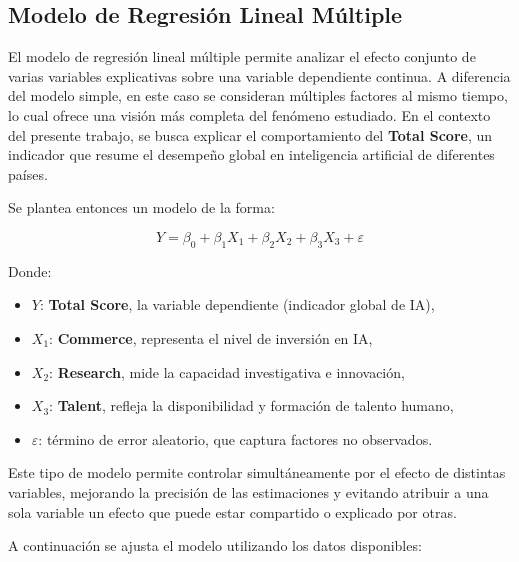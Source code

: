 \documentclass[
]{article}
\begin{document}
\begin{multicols}{2}
\subsection{Modelo de Regresión Lineal Múltiple}

El modelo de regresión lineal múltiple permite analizar el efecto conjunto de varias variables explicativas sobre una variable dependiente continua. A diferencia del modelo simple, en este caso se consideran múltiples factores al mismo tiempo, lo cual ofrece una visión más completa del fenómeno estudiado. En el contexto del presente trabajo, se busca explicar el comportamiento del \textbf{Total Score}, un indicador que resume el desempeño global en inteligencia artificial de diferentes países.

Se plantea entonces un modelo de la forma:

\[
Y = \beta_0 + \beta_1 X_1 + \beta_2 X_2 + \beta_3 X_3 + \varepsilon
\]

Donde:

\begin{itemize}
  \item \( Y \): \textbf{Total Score}, la variable dependiente (indicador global de IA),
  \item \( X_1 \): \textbf{Commerce}, representa el nivel de inversión en IA,
  \item \( X_2 \): \textbf{Research}, mide la capacidad investigativa e innovación,
  \item \( X_3 \): \textbf{Talent}, refleja la disponibilidad y formación de talento humano,
  \item \( \varepsilon \): término de error aleatorio, que captura factores no observados.
\end{itemize}

Este tipo de modelo permite controlar simultáneamente por el efecto de distintas variables, mejorando la precisión de las estimaciones y evitando atribuir a una sola variable un efecto que puede estar compartido o explicado por otras.

A continuación se ajusta el modelo utilizando los datos disponibles:

\begin{table}[H]
\centering
\caption{\label{tab:modelo_multip_fit_clean}Tabla. Coeficientes estimados del modelo de regresión múltiple}
\centering
{}
\end{table}


\end{multicols}
\end{document}
